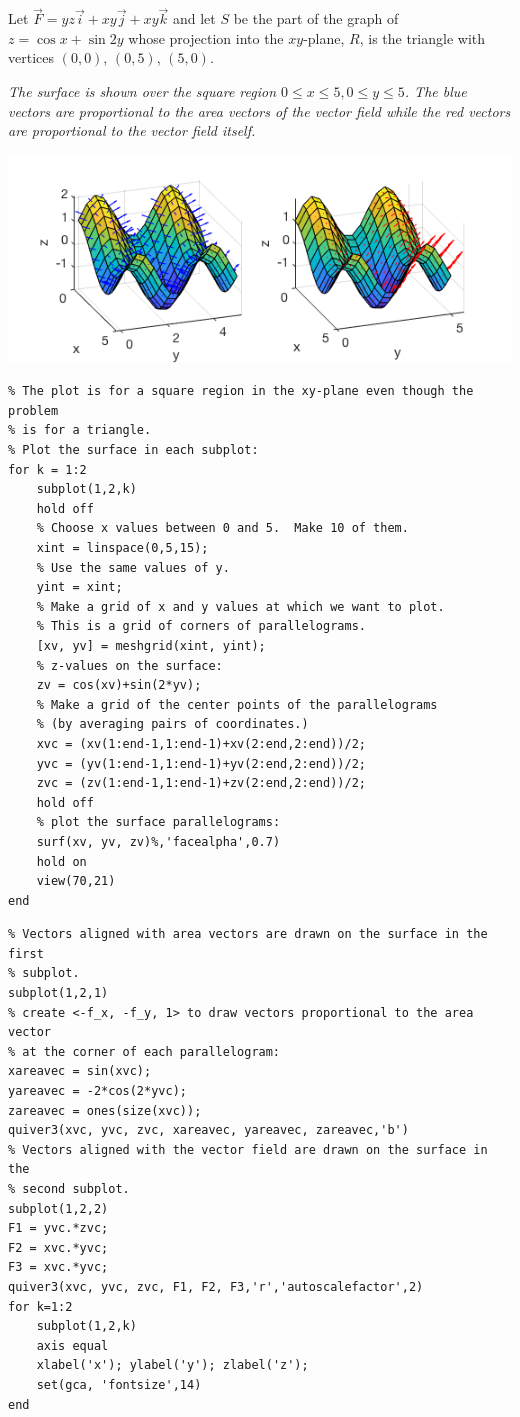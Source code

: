 \documentclass[12pt,letterpaper,noanswers]{exam}
\begin{document}
\begin{questions}
\quad  





\question  Let $\vec F = yz\vec i + xy\vec j + xy\vec k$ and let $S$ be the part of the graph of $z = \cos x + \sin 2y$ whose projection into the $xy$-plane, $R$, is the triangle with vertices $(0,0)$, $(0,5)$, $(5,0)$.

\emph{The surface is shown over the square region $0\leq x\leq 5, 0\leq y\leq 5$.  The blue vectors are proportional to the area vectors of the vector field while the red vectors are proportional to the vector field itself.}

\includegraphics[width=\linewidth]{img/pset11p1-18.png}

\begin{lstlisting}
% The plot is for a square region in the xy-plane even though the problem
% is for a triangle.
% Plot the surface in each subplot:
for k = 1:2
    subplot(1,2,k)
    hold off
    % Choose x values between 0 and 5.  Make 10 of them.
    xint = linspace(0,5,15);
    % Use the same values of y.
    yint = xint;
    % Make a grid of x and y values at which we want to plot.
    % This is a grid of corners of parallelograms.
    [xv, yv] = meshgrid(xint, yint);
    % z-values on the surface:
    zv = cos(xv)+sin(2*yv);
    % Make a grid of the center points of the parallelograms 
    % (by averaging pairs of coordinates.)
    xvc = (xv(1:end-1,1:end-1)+xv(2:end,2:end))/2;
    yvc = (yv(1:end-1,1:end-1)+yv(2:end,2:end))/2;
    zvc = (zv(1:end-1,1:end-1)+zv(2:end,2:end))/2;
    hold off
    % plot the surface parallelograms:
    surf(xv, yv, zv)%,'facealpha',0.7)
    hold on
    view(70,21)
end
\end{lstlisting}
\begin{lstlisting}
% Vectors aligned with area vectors are drawn on the surface in the first 
% subplot.
subplot(1,2,1)
% create <-f_x, -f_y, 1> to draw vectors proportional to the area vector
% at the corner of each parallelogram:
xareavec = sin(xvc);
yareavec = -2*cos(2*yvc);
zareavec = ones(size(xvc));
quiver3(xvc, yvc, zvc, xareavec, yareavec, zareavec,'b')
% Vectors aligned with the vector field are drawn on the surface in the
% second subplot.
subplot(1,2,2)
F1 = yvc.*zvc;
F2 = xvc.*yvc;
F3 = xvc.*yvc;
quiver3(xvc, yvc, zvc, F1, F2, F3,'r','autoscalefactor',2)
for k=1:2
    subplot(1,2,k)
    axis equal
    xlabel('x'); ylabel('y'); zlabel('z');
    set(gca, 'fontsize',14)
end
\end{lstlisting}
\begin{parts}

\end{parts}
\end{questions}
\end{document}

